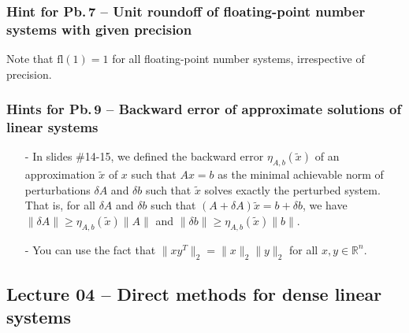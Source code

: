 \documentclass[letterpaper,10pt]{article}
\begin{document}
\subsubsection*{Hint for Pb.$\,$7 -- Unit roundoff of floating-point number systems with given precision}
Note that $\mathrm{fl}(1)=1$ for all floating-point number systems, irrespective of precision.

\subsubsection*{Hints for Pb.$\,$9 -- Backward error of approximate solutions of linear systems}
\begin{itemize}
\item[-] In slides \#14-15, we defined the backward error $\eta_{A,b}(\tilde{x})$ of an approximation $\tilde{x}$ of $x$ such that $Ax=b$ as the minimal achievable norm of perturbations $\delta A$ and $\delta b$ such that $\tilde{x}$ solves exactly the perturbed system.
That is, for all $\delta A$ and $\delta b$ such that $(A+\delta A)\tilde{x}=b+\delta b$, we have $\|\delta A\|\geq \eta_{A,b}(\tilde{x})\|A\|$ and $\|\delta b\|\geq \eta_{A,b}(\tilde{x})\|b\|$.
\item[-] You can use the fact that $\|xy^T\|_2=\|x\|_2\|y\|_2$ for all $x,y\in\mathbb{R}^n$.
\end{itemize}

\subsection*{Lecture 04 -- Direct methods for dense linear systems}
\end{document}
